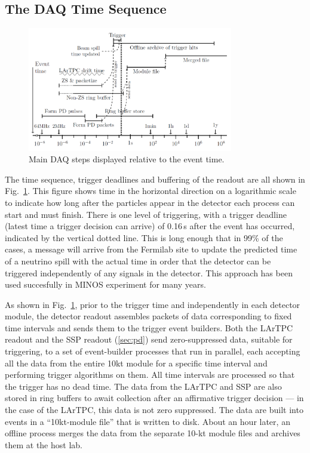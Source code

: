 \subsection{The DAQ Time Sequence}
\begin{figure}[h!]
	\centering
	\includegraphics[width=0.8\textwidth]{daq-steps.png}
	\caption{Main DAQ steps displayed relative to the event time.}
	\label{fig:fddaqtime}
\end{figure}
\noindent
The time sequence, trigger deadlines and buffering of the readout are all
shown in Fig.~\ref{fig:fddaqtime}.  This figure shows time in the
horizontal direction on a logarithmic scale to indicate how long after
the particles appear in the detector each process can start and must
finish.  There is one level of triggering, with a trigger deadline
(latest time a trigger decision can arrive) of
0.16\,s after the event has occurred, indicated by the vertical dotted
line.  This is long enough that in 99\% of the cases, a message will
arrive from the Fermilab site to update the predicted time of a
neutrino spill with the actual time in order that the detector can be
triggered independently of any signals in the detector.  This approach
has been used succesfully in MINOS experiment for many years.  

As shown in Fig.~\ref{fig:fddaqtime}, prior to the trigger time and
independently in each detector module, the detector readout assembles
packets of data corresponding to fixed time intervals and sends them
to the trigger event builders.  Both the LArTPC readout and the SSP
readout (\ref{sec:pd}) send zero-suppressed data, suitable for triggering, to a set
of event-builder processes that run in parallel, each accepting all
the data from the entire 10kt module for a specific time interval and
performing trigger algorithms on them.  All time intervals are
processed so that the trigger has no dead time.  The data from the LArTPC and SSP
are also stored in ring buffers to await collection after an
affirmative trigger decision --- in the case of the LArTPC, this data
is not zero suppressed.  The data are built into events in a ``10kt-module
file'' that is written to disk.  About an hour later, an offline process merges
the data from the separate 10-kt module files and archives them at the host lab.

